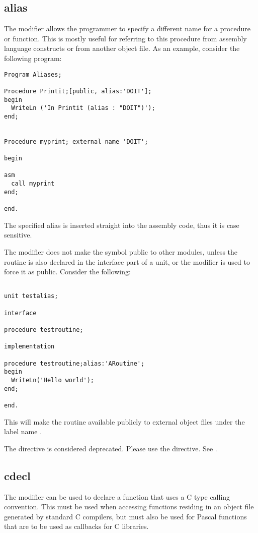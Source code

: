 \subsection{alias}
\label{se:alias}
The  modifier allows the programmer to specify a different name for a
procedure or function. This is mostly useful for referring to this procedure
from assembly language constructs or from another object file. As an example,
consider the following program:
\begin{verbatim}
Program Aliases;

Procedure Printit;[public, alias:'DOIT'];
begin
  WriteLn ('In Printit (alias : "DOIT")');
end;


Procedure myprint; external name 'DOIT';

begin

asm
  call myprint
end;

end.
\end{verbatim}
\begin{remark} The specified alias is inserted straight into the assembly
code, thus it is case sensitive.
\end{remark}
The  modifier does not make the symbol public to other modules,
unless the routine is also declared in the interface part of a unit, or
the  modifier is used to force it as public. Consider the
following:
\begin{verbatim}

unit testalias;

interface

procedure testroutine;

implementation

procedure testroutine;alias:'ARoutine';
begin
  WriteLn('Hello world');
end;

end.
\end{verbatim}
This will make the routine  available publicly to
external object files under the label name .

\begin{remark}
The  directive is considered deprecated. Please use the
 directive. See .
\end{remark}

\subsection{cdecl}
\label{se:cdecl}
The  modifier can be used to declare a function that uses a C
type calling convention. This must be used when accessing functions residing in
an object file generated by standard C compilers, but must also be used for
Pascal functions that are to be used as callbacks for C libraries. 

